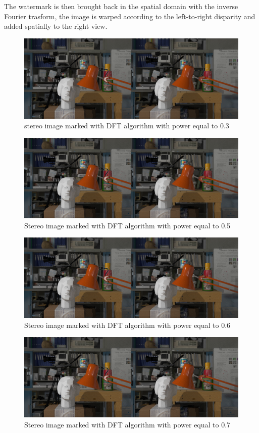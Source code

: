 The watermark is then brought back in the spatial domain with the inverse Fourier trasform, the image is warped according to the left-to-right disparity and added spatially to the right view.
\begin{figure}[h!]
\centering
\includegraphics[width=1\textwidth]{./img/marked_03_DFT.png}
\caption{\small{stereo image marked with DFT algorithm with power equal to 0.3}}
\label{fig:dft03}
\end{figure}
\begin{figure}[h!]
\centering
\includegraphics[width=1\textwidth]{./img/marked_05_DFT.png}
\caption{\small{Stereo image marked with DFT algorithm with power equal to 0.5}}
\label{fig:dft05}
\end{figure}
\begin{figure}[h!]
\centering
\includegraphics[width=1\textwidth]{./img/marked_06_DFT.png}
\caption{\small{Stereo image marked with DFT algorithm with power equal to 0.6}}
\label{fig:dft06}
\end{figure}
\begin{figure}[h!]
\centering
\includegraphics[width=1\textwidth]{./img/marked_07_DFT.png}
\caption{\small{Stereo image marked with DFT algorithm with power equal to 0.7}}
\label{fig:dft07}
\end{figure}
